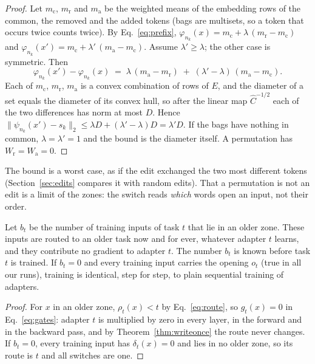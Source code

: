 \begin{proof}
Let $m_{\mathrm{c}}$, $m_{\mathrm{r}}$ and $m_{\mathrm{a}}$ be the weighted means of the embedding rows of the common, the removed
and the added tokens (bags are multisets, so a token that occurs twice counts twice). By
Eq.~\eqref{eq:prefix}, $\varphi_{n_k}(x) = m_{\mathrm{c}} + \lambda\,(m_{\mathrm{r}} - m_{\mathrm{c}})$ and
$\varphi_{n_k}(x') = m_{\mathrm{c}} + \lambda'\,(m_{\mathrm{a}} - m_{\mathrm{c}})$. Assume $\lambda' \ge \lambda$; the other case is
symmetric. Then
\[
  \varphi_{n_k}(x') - \varphi_{n_k}(x) \;=\; \lambda\,(m_{\mathrm{a}} - m_{\mathrm{r}}) \;+\; (\lambda' - \lambda)\,(m_{\mathrm{a}} - m_{\mathrm{c}}) .
\]
Each of $m_{\mathrm{c}}$, $m_{\mathrm{r}}$, $m_{\mathrm{a}}$ is a convex combination of rows of $E$, and the diameter of a set
equals the diameter of its convex hull, so after the linear map $\hat{C}^{-1/2}$ each of the two
differences has norm at most $D$. Hence
$\lVert \psi_{n_k}(x') - s_k \rVert_2 \le \lambda D + (\lambda' - \lambda) D = \lambda' D$. If the bags
have nothing in common, $\lambda = \lambda' = 1$ and the bound is the diameter itself. A
permutation has $W_{\mathrm{r}} = W_{\mathrm{a}} = 0$.
\end{proof}

The bound is a worst case, as if the edit exchanged the two most different tokens (Section~\ref{sec:edits} compares it with random edits). That a permutation is not an edit is a limit of the zones: the switch reads \emph{which} words open an input, not their order.

\begin{proposition}
\label{prop:price}
Let $b_t$ be the number of training inputs of task $t$ that lie in an older zone. These inputs are
routed to an older task now and for ever, whatever adapter $t$ learns, and they contribute no
gradient to adapter $t$. The number $b_t$ is known before task $t$ is trained. If $b_t = 0$ and every training input carries the opening $o_t$ (true in all our runs), training is identical, step for step, to plain sequential
training of adapters.
\end{proposition}

\begin{proof}
For $x$ in an older zone, $\rho_t(x) < t$ by Eq.~\eqref{eq:route}, so $g_t(x) = 0$ in
Eq.~\eqref{eq:gates}: adapter $t$ is multiplied by zero in every layer, in the forward and in the
backward pass, and by Theorem~\ref{thm:writeonce} the route never changes. If $b_t = 0$, every
training input has $\delta_t(x) = 0$ and lies in no older zone, so its route is $t$ and all switches
are one.
\end{proof}

